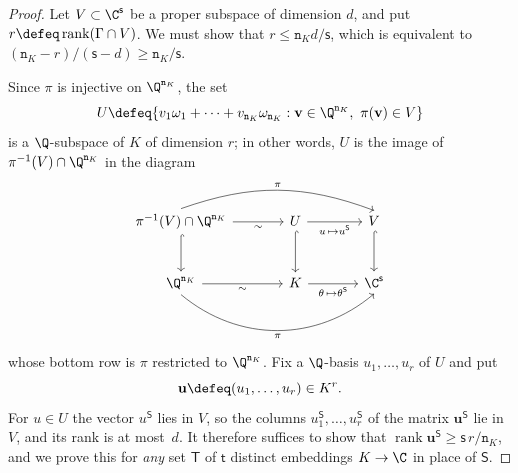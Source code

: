\documentclass[11pt, reqno, twoside, letterpaper]{amsart}
\newcommand{\vu}{\mathbf{u}}
\newcommand{\vv}{\mathbf{v}}
\DeclareMathOperator{\rk}{rank}
\newcommand{\dK}{{\mathtt{n}_K}}
\newcommand{\Kf}{K}
\newcommand{\lat}{\Gamma}
\newcommand{\Sset}{\mathsf{S}}
\newcommand{\nS}{\mathsf{s}}
\newcommand{\Tset}{\mathsf{T}}
\newcommand{\nT}{\mathsf{t}}
\begin{document}
\begin{proof}
Let $V\subset\C^{\nS}$ be a proper subspace of dimension $d$, and put
$r\defeq\rk(\lat\cap V)$. We must show that $r\le\dK d/\nS$, which is
equivalent to $(\dK-r)/(\nS-d)\ge\dK/\nS$.

Since $\pi$ is injective on $\Q^{\dK}$, the set
\[
U\defeq\{v_1\omega_1+\dots+v_\dK\omega_\dK:\vv\in\Q^{\dK},\
\pi(\vv)\in V\}
\]
is a $\Q$-subspace of $\Kf$ of dimension $r$; in other words, $U$ is
the image of $\pi^{-1}(V)\cap\Q^{\dK}$ in the diagram
\[
\begin{tikzcd}[column sep=large, row sep=large]
\pi^{-1}(V)\cap\Q^{\dK} \arrow[r, "\sim"'] \arrow[d, hook]
\arrow[rr, bend left=20, "\pi", start anchor=north, end anchor=north]
& U \arrow[r, "u\,\mapsto u^{\Sset}"'] \arrow[d, hook]
& V \arrow[d, hook] \\
\Q^{\dK} \arrow[r, "\sim"']
\arrow[rr, bend right=40, "\pi"', start anchor=south, end anchor=south]
& \Kf \arrow[r, "\theta\,\mapsto\theta^{\Sset}"']
& \C^{\nS}
\end{tikzcd}
\]
whose bottom row is $\pi$ restricted to $\Q^{\dK}$. Fix a $\Q$-basis
$u_1,\dots,u_r$ of $U$ and put
\[
\vu\defeq(u_1,\dots,u_r)\in\Kf^r.
\]
For $u\in U$ the vector $u^{\Sset}$ lies in $V$, so the columns
$u_1^{\Sset},\dots,u_r^{\Sset}$ of the matrix $\vu^{\Sset}$ lie in
$V$, and its rank is at most~$d$. It therefore suffices to show that
$\rk\vu^{\Sset}\ge\nS\,r/\dK$, and we prove this for \emph{any} set
$\Tset$ of $\nT$ distinct embeddings $\Kf\to\C$ in place of $\Sset$.


\end{proof}
\end{document}
